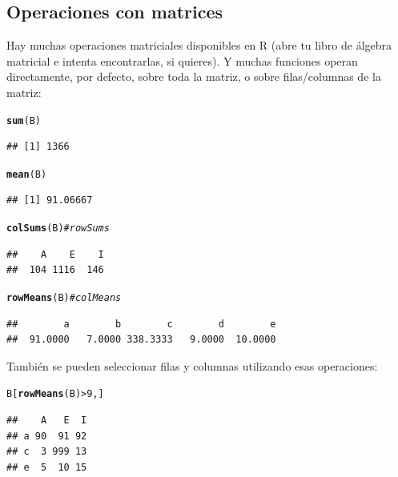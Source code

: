 \documentclass{config/apuntes}\usepackage[]{graphicx}\usepackage[]{xcolor}
\makeatletter
\newcommand{\hlnum}[1]{\textcolor[rgb]{0.686,0.059,0.569}{#1}}%
\newcommand{\hlcom}[1]{\textcolor[rgb]{0.678,0.584,0.686}{\textit{#1}}}%
\newcommand{\hlopt}[1]{\textcolor[rgb]{0,0,0}{#1}}%
\newcommand{\hldef}[1]{\textcolor[rgb]{0.345,0.345,0.345}{#1}}%
\newcommand{\hlkwd}[1]{\textcolor[rgb]{0.737,0.353,0.396}{\textbf{#1}}}%
\newenvironment{kframe}{%
 \def\at@end@of@kframe{}%
 \ifinner\ifhmode%
  \def\at@end@of@kframe{\end{minipage}}%
  \begin{minipage}{\columnwidth}%
 \fi\fi%
 \def\FrameCommand##1{\hskip\@totalleftmargin \hskip-\fboxsep
 \colorbox{shadecolor}{##1}\hskip-\fboxsep
     \hskip-\linewidth \hskip-\@totalleftmargin \hskip\columnwidth}%
 \MakeFramed {\advance\hsize-\width
   \@totalleftmargin\z@ \linewidth\hsize
   \@setminipage}}%
 {\par\unskip\endMakeFramed%
 \at@end@of@kframe}
\newenvironment{knitrout}{}{} %
\makeatother
\begin{document}
\subsection{Operaciones con matrices}
Hay muchas operaciones matriciales disponibles en R (abre tu libro de álgebra matricial e intenta encontrarlas, si quieres). Y muchas funciones operan directamente, por defecto, sobre toda la matriz, o sobre filas/columnas de la matriz:
\begin{knitrout}
\color{fgcolor}\begin{kframe}
\begin{alltt}
\hlkwd{sum}\hldef{(B)}
\end{alltt}
\begin{verbatim}
## [1] 1366
\end{verbatim}
\begin{alltt}
\hlkwd{mean}\hldef{(B)}
\end{alltt}
\begin{verbatim}
## [1] 91.06667
\end{verbatim}
\begin{alltt}
\hlkwd{colSums}\hldef{(B)} \hlcom{#rowSums}
\end{alltt}
\begin{verbatim}
##    A    E    I 
##  104 1116  146
\end{verbatim}
\begin{alltt}
\hlkwd{rowMeans}\hldef{(B)} \hlcom{#colMeans }
\end{alltt}
\begin{verbatim}
##        a        b        c        d        e 
##  91.0000   7.0000 338.3333   9.0000  10.0000
\end{verbatim}
\end{kframe}
\end{knitrout}

También se pueden seleccionar filas y columnas utilizando esas operaciones:
\begin{knitrout}
\color{fgcolor}\begin{kframe}
\begin{alltt}
\hldef{B[}\hlkwd{rowMeans}\hldef{(B)} \hlopt{>} \hlnum{9}\hldef{, ]}
\end{alltt}
\begin{verbatim}
##    A   E  I
## a 90  91 92
## c  3 999 13
## e  5  10 15
\end{verbatim}
\end{kframe}
\end{knitrout}
\end{document}
